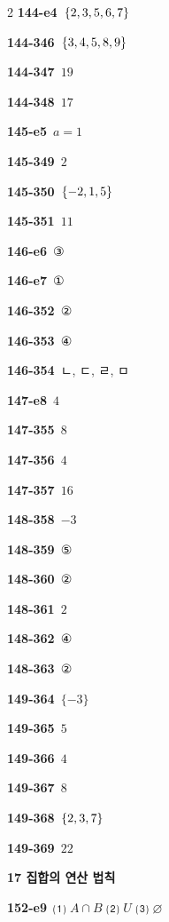 \documentclass[10pt,a4paper]{article}
\begin{document}
\begin{multicols}{2}
\noindent\textbf{144-e4}\ $\{2{,}\mkern3mu\mathopen{}3{,}\mkern3mu\mathopen{}5{,}\mkern3mu\mathopen{}6{,}\mkern3mu\mathopen{}7\}$\par
\noindent\textbf{144-346}\ $\{3{,}\mkern3mu\mathopen{}4{,}\mkern3mu\mathopen{}5{,}\mkern3mu\mathopen{}8{,}\mkern3mu\mathopen{}9\}$\par
\noindent\textbf{144-347}\ $19$\par
\noindent\textbf{144-348}\ $17$\par
\noindent\textbf{145-e5}\ $a=1$\par
\noindent\textbf{145-349}\ $2$\par
\noindent\textbf{145-350}\ $\{-2{,}\mkern3mu\mathopen{}1{,}\mkern3mu\mathopen{}5\}$\par
\noindent\textbf{145-351}\ $11$\par
\noindent\textbf{146-e6}\ ③\par
\noindent\textbf{146-e7}\ ①\par
\noindent\textbf{146-352}\ ②\par
\noindent\textbf{146-353}\ ④\par
\noindent\textbf{146-354}\ ㄴ, ㄷ, ㄹ, ㅁ\par
\noindent\textbf{147-e8}\ $4$\par
\noindent\textbf{147-355}\ $8$\par
\noindent\textbf{147-356}\ $4$\par
\noindent\textbf{147-357}\ $16$\par
\noindent\textbf{148-358}\ $-3$\par
\noindent\textbf{148-359}\ ⑤\par
\noindent\textbf{148-360}\ ②\par
\noindent\textbf{148-361}\ $2$\par
\noindent\textbf{148-362}\ ④\par
\noindent\textbf{148-363}\ ②\par
\noindent\textbf{149-364}\ $\{-3\}$\par
\noindent\textbf{149-365}\ $5$\par
\noindent\textbf{149-366}\ $4$\par
\noindent\textbf{149-367}\ $8$\par
\noindent\textbf{149-368}\ $\{2{,}\mkern3mu\mathopen{}3{,}\mkern3mu\mathopen{}7\}$\par
\noindent\textbf{149-369}\ $22$\par
\noindent\textbf{17 집합의 연산 법칙}\par\smallskip
\noindent\textbf{152-e9}\ ⑴ $A\cap B$ ⑵ $U$ ⑶ $\varnothing$\par

\end{multicols}
\end{document}
